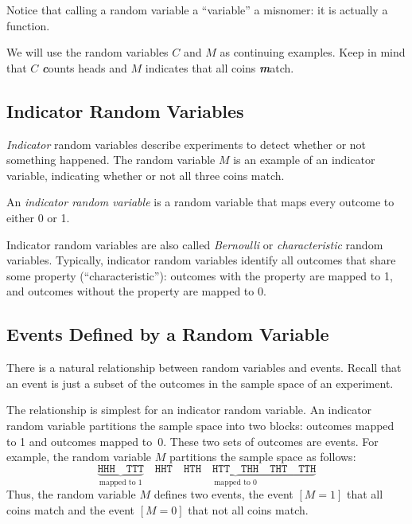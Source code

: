 \documentclass[11pt,twoside]{article}
\begin{document}
Notice that calling a random variable a ``variable'' a misnomer: it is
actually a function.

We will use the random variables $C$ and $M$ as continuing examples.  Keep
in mind that $C$ \textbf{\emph{c}}ounts heads and $M$ indicates that all
coins \textbf{\emph{m}}atch.

\subsection{Indicator Random Variables}

\emph{Indicator} random variables describe experiments to detect whether
or not something happened.  The random variable $M$ is an example of an
indicator variable, indicating whether or not all three coins match.

\begin{definition}
An \emph{indicator random variable} is a random variable that maps
every outcome to either 0 or 1.
\end{definition}

Indicator random variables are also called \emph{Bernoulli} or
\emph{characteristic} random variables.  Typically, indicator random
variables identify all outcomes that share some property
(``characteristic''): outcomes with the property are mapped to 1, and
outcomes without the property are mapped to 0.

\subsection{Events Defined by a Random Variable}

There is a natural relationship between random variables and events.
Recall that an event is just a subset of the outcomes in the sample
space of an experiment.

The relationship is simplest for an indicator random variable.  An
indicator random variable partitions the sample space into two blocks:
outcomes mapped to 1 and outcomes mapped to~0.  These two sets of outcomes
are events.  For example, the random variable $M$ partitions the sample
space as follows:
\[
\underbrace{\mathtt{HHH} \quad \mathtt{TTT}}_{\mbox{mapped to 1}} \quad
\underbrace{\mathtt{HHT} \quad \mathtt{HTH} \quad \mathtt{HTT} \quad
        \mathtt{THH} \quad \mathtt{THT} \quad \mathtt{TTH}}_{\mbox{mapped to 0}}
\]
Thus, the random variable $M$ defines two events, the event $[M = 1]$ that
all coins match and the event $[M = 0]$ that not all coins match.
\end{document}
